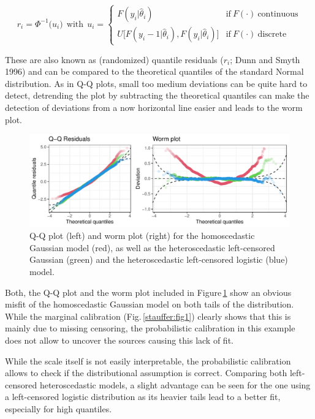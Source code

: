 \documentclass[twoside]{report}
\begin{document}
$$
r_i = \Phi^{-1}\big(u_i)~~\text{with}~~u_i = \begin{cases}
    F(y_i | \hat{\theta}_i) & \text{if}~F(\cdot)~\text{continuous}  \\
    U\big[F(y_i - 1 | \hat{\theta}_i), F(y_i | \hat{\theta}_i)\big] & \text{if}~F(\cdot)~\text{discrete}
\end{cases}
$$

These are also known as (randomized) quantile residuals ($r_i$; Dunn and Smyth
1996) and can be compared to the theoretical quantiles of the standard Normal
distribution.  As in Q-Q plots, small too medium deviations can be quite hard
to detect, detrending the plot by subtracting the theoretical quantiles can
make the detection of deviations from a now horizontal line easier and leads to
the worm plot.

\begin{figure}[!ht]\centering
    \includegraphics[width=\textwidth]{Stauffer-qqresiduals}
    \caption{\label{stauffer:fig2} 
        Q-Q plot (left) and worm plot (right) for the homoscedastic
        Gaussian model (red), as well as the heteroscedastic left-censored
        Gaussian (green) and the heteroscedastic left-censored logistic (blue) model.
    }
\end{figure}

Both, the Q-Q plot and the worm plot included in Figure\,\ref{stauffer:fig2}
show an obvious misfit of the homoscedastic Gaussian model on both tails of the
distribution. While the marginal calibration (Fig.\,\ref{stauffer:fig1})
clearly shows that this is mainly due to missing censoring, the probabilistic
calibration in this example does not allow to uncover the sources causing this
lack of fit.

While the scale itself is not easily interpretable, the probabilistic calibration
allows to check if the distributional assumption is correct.  Comparing both
left-censored heteroscedastic models, a slight advantage can be seen for the
one using a left-censored logistic distribution as its heavier tails lead to a
better fit, especially for high quantiles.
\end{document}
